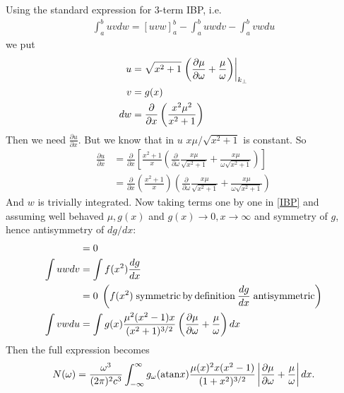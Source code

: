 \documentclass[]{article}
\begin{document}
Using the standard expression for 3-term IBP, i.e.
\begin{align}\label{IBP}
\int_a^b u v dw = [uvw]_a^b - \int_a^b uw dv - \int_a^b vw du
\end{align} we put
\begin{align}
u&= \sqrt{x^2 +1} \left.\left( \frac{\partial \mu}{\partial \omega} + \frac {\mu}{\omega}\right) \right|_{k_\perp}\\
v&=g(x)\\
dw &= \frac{\partial}{\partial x}\left(\frac{x^2 \mu^2}{x^2 +1}\right)
\end{align}
Then we need $\frac{\partial u}{\partial x}$. But we know that in $u$ $ x \mu / \sqrt{x^2 +1}$ is constant. So
\begin{align}
\frac{\partial u}{\partial x} &= \frac{\partial}{\partial x} \left[ \frac{x^2+1}{x} \left( \frac{\partial}{\partial \omega} \frac{x \mu}{\sqrt{x^2+1}}  + \frac{x \mu}{\omega\sqrt{x^2+1}} \right)\right]\\
&=\frac{\partial}{\partial x} \left(\frac{x^2+1}{x} \right) \left( \frac{\partial}{\partial \omega} \frac{x \mu}{\sqrt{x^2+1}}  + \frac{x \mu}{\omega\sqrt{x^2+1}} \right)
\end{align}
And $w$ is trivially integrated.
Now taking terms one by one in \ref{IBP} and assuming well behaved $\mu, g(x)$ and $g(x)\rightarrow 0, x\rightarrow \infty$ and symmetry of $g$, hence antisymmetry of $dg/dx$:
\begin{align}
[uvw] &= 0 \\
\int u w dv &= \int f(x^2) \frac{dg}{dx}\notag\\
&= 0 \; \left(f(x^2) \;\mathrm{symmetric \,by\, definition}\: \frac{dg}{dx} \;\mathrm{antisymmetric}\right)\\
\int vw du &= \int g(x) \frac{\mu^2 (x^2-1) x}{(x^2 +1)^{3/2}} \left( \frac{\partial \mu}{\partial \omega} + \frac{ \mu}{\omega} \right)  d x
\end{align}
Then the full expression becomes \begin{equation}\label{N_IBP}
N(\omega) = \frac{\omega^3}{(2\pi)^2 c^3} \int_{-\infty}^\infty g_\omega( \mathrm{atan} x ) 
 \frac{\mu(x)^2 x (x^2-1)}{(1+x^2)^{3/2}}
 \left| \frac{\partial \mu}{\partial \omega} + \frac {\mu}{\omega}\right|
 d x .
\end{equation}
\end{document}
